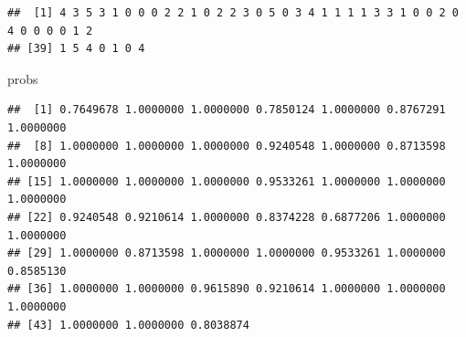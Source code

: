 \documentclass[
]{article}
\newenvironment{Shaded}{\begin{snugshade}}{\end{snugshade}}
\newcommand{\AttributeTok}[1]{\textcolor[rgb]{0.13,0.29,0.53}{#1}}
\newcommand{\CommentTok}[1]{\textcolor[rgb]{0.56,0.35,0.01}{\textit{#1}}}
\newcommand{\FunctionTok}[1]{\textcolor[rgb]{0.13,0.29,0.53}{\textbf{#1}}}
\newcommand{\NormalTok}[1]{#1}
\newcommand{\OtherTok}[1]{\textcolor[rgb]{0.56,0.35,0.01}{#1}}
\newcommand{\SpecialCharTok}[1]{\textcolor[rgb]{0.81,0.36,0.00}{\textbf{#1}}}
\begin{document}
\begin{verbatim}
##  [1] 4 3 5 3 1 0 0 0 2 2 1 0 2 2 3 0 5 0 3 4 1 1 1 1 3 3 1 0 0 2 0 4 0 0 0 0 1 2
## [39] 1 5 4 0 1 0 4
\end{verbatim}

\begin{Shaded}
\begin{Highlighting}[]
\NormalTok{probs}
\end{Highlighting}
\end{Shaded}

\begin{verbatim}
##  [1] 0.7649678 1.0000000 1.0000000 0.7850124 1.0000000 0.8767291 1.0000000
##  [8] 1.0000000 1.0000000 1.0000000 0.9240548 1.0000000 0.8713598 1.0000000
## [15] 1.0000000 1.0000000 1.0000000 0.9533261 1.0000000 1.0000000 1.0000000
## [22] 0.9240548 0.9210614 1.0000000 0.8374228 0.6877206 1.0000000 1.0000000
## [29] 1.0000000 0.8713598 1.0000000 1.0000000 0.9533261 1.0000000 0.8585130
## [36] 1.0000000 1.0000000 0.9615890 0.9210614 1.0000000 1.0000000 1.0000000
## [43] 1.0000000 1.0000000 0.8038874
\end{verbatim}

\begin{Shaded}
\end{Shaded}
\end{document}

